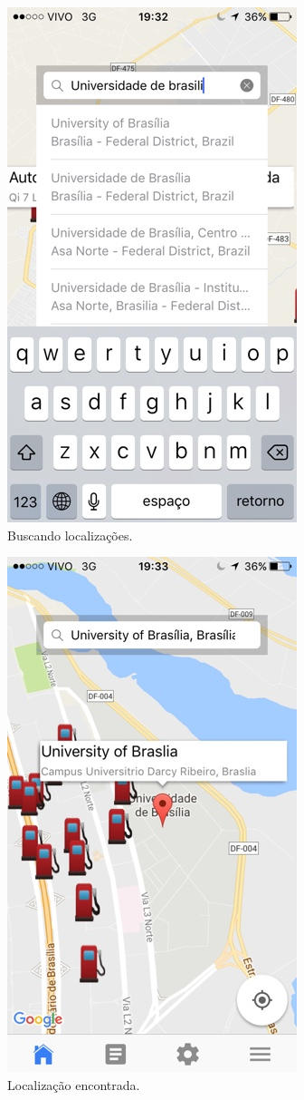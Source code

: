 \begin{anexosenv}
\begin{figure}[H]
    \centering
    \includegraphics[scale=0.5]{figuras/app_3.jpg}
    \caption[Buscando localizações]{Buscando localizações.}
    \label{img:buscando_localizacoes}
\end{figure}

\begin{figure}[H]
    \centering
    \includegraphics[scale=0.5]{figuras/app_4.jpg}
    \caption[Localização encontrada]{Localização encontrada.}
    \label{img:localizacao_encontrada}
\end{figure}


\end{anexosenv}
